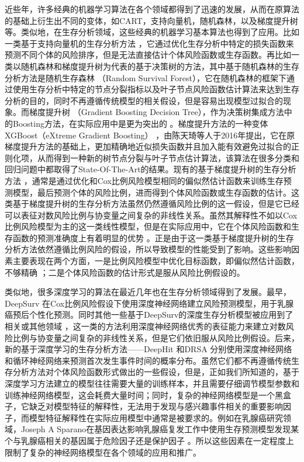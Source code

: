 近些年，许多经典的机器学习算法在各个领域都得到了迅速的发展，从而在原算法的基础上衍生出不同的变体，如CART，支持向量机，随机森林，以及梯度提升树等。类似地，在生存分析领域，这些经典的机器学习基本算法也得到了应用。比如一类基于支持向量机的生存分析方法 ，它通过优化生存分析中特定的损失函数来预测不同个体的风险排序，但是无法直接估计个体风险函数或生存函数。再比如一类以随机森林和梯度提升树为代表的基于决策树的方法，其中基于随机森林的生存分析方法是随机生存森林 （Random Survival Forest），它在随机森林的框架下通过使用生存分析中特定的节点分裂指标以及叶子节点风险函数估计算法来达到生存分析的目的，同时不再遵循传统模型的相关假设，但是容易出现模型过拟合的现象。而梯度提升树 （Gradient Boosting Decision Tree），作为决策树集成方法中的Boosting方法，在实际应用中是更为突出的 。梯度提升方法的一种变体XGBoost（eXtreme Gradient Boosting） ，由陈天琦等人于2016年提出，它在原梯度提升方法的基础上，更加精确地近似损失函数并且加入能有效避免过拟合的正则化项，从而得到一种新的树节点分裂与叶子节点估计算法，该算法在很多分类和回归问题中都取得了State-Of-The-Art的结果。现有的基于梯度提升树的生存分析方法 ，通常是通过优化和Cox比例风险模型相同的偏似然估计函数来训练生存预测模型，最后预测个体的风险比例，进而得到个体风险函数或生存函数的估计。这类基于梯度提升树的生存分析方法虽然仍然遵循风险比例的这一假设，但是它已经可以表征对数风险比例与协变量之间复杂的非线性关系。虽然其解释性不如以Cox比例风险模型为主的这一类线性模型，但是在实际应用中，它在个体风险函数和生存函数的预测准确度上有着明显的优势 。正是由于这一类基于梯度提升树的生存分析方法依然遵循比例风险的假设，所以导致模型的性能受到了影响。这些影响因素主要表现在两个方面，一是比例风险模型中优化目标函数，即偏似然估计函数，不够精确 ；二是个体风险函数的估计形式是服从风险比例假设的。
    
类似地，很多深度学习的算法在最近几年也在生存分析领域得到了发展。最早，DeepSurv 在Cox比例风险假设下使用深度神经网络建立风险预测模型，用于乳腺癌预后个性化预测。同时其他一些基于DeepSurv的深度生存分析模型被应用到了相关或其他领域 ，这一类的方法利用深度神经网络优秀的表征能力来建立对数风险比例与协变量之间复杂的非线性关系，但是它们依旧服从风险比例假设。后来，新的基于深度学习的生存分析方法——DeepHit 和DRSA 分别使用深度神经网络和循环神经网络来预测首次发生事件时间的概率分布。虽然它们都不再遵循传统生存分析方法对个体风险函数形式做出的一些假设，但是，正如我们所知道的，基于深度学习方法建立的模型往往需要大量的训练样本，并且需要仔细调节模型参数和训练神经网络模型，这会耗费大量时间；同时，复杂的神经网络模型是一个黑盒子，它缺乏对模型特征的解释性，无法用于发现与感兴趣事件相关的重要影响因子，而模型特征解释性在实际应用模型中通常是被要求的。例如在乳腺癌研究领域，Joseph A Sparano在基因表达影响乳腺癌复发工作中使用生存预测模型发现某个与乳腺癌相关的基因属于危险因子还是保护因子 。所以这些因素在一定程度上限制了复杂的神经网络模型在各个领域的应用和推广。

